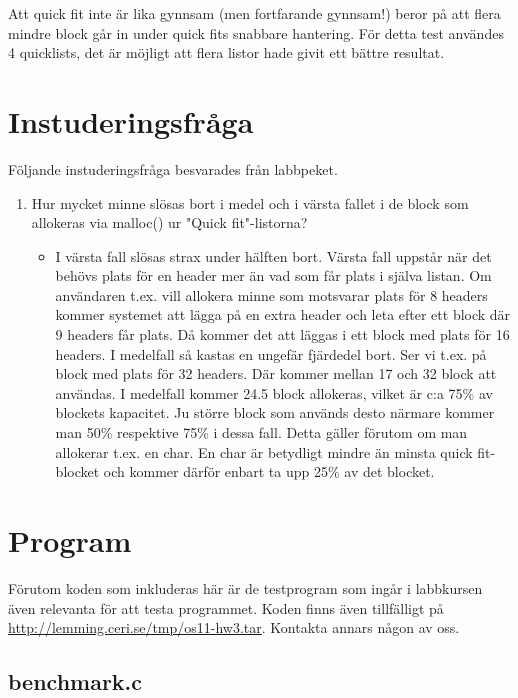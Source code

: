 \documentclass[a4paper,11pt]{article}
\begin{document}
Att quick fit inte är lika gynnsam (men fortfarande gynnsam!) beror på att flera mindre block går in under quick fits snabbare hantering. För detta test användes 4 quicklists, det är möjligt att flera listor hade givit ett bättre resultat.

\section*{Instuderingsfråga}

Följande instuderingsfråga besvarades från labbpeket.

\begin{enumerate}
	\item Hur mycket minne slösas bort i medel och i värsta fallet i de block som allokeras via malloc() ur "Quick fit"-listorna?
	\begin{itemize}
		\item I värsta fall slösas strax under hälften bort. Värsta fall uppstår när det behövs plats för en header mer än vad som får plats i själva listan. Om användaren t.ex. vill allokera minne som motsvarar plats för 8 headers kommer systemet att lägga på en extra header och leta efter ett block där 9 headers får plats. Då kommer det att läggas i ett block med plats för 16 headers. I medelfall så kastas en ungefär fjärdedel bort. Ser vi t.ex. på block med plats för 32 headers. Där kommer mellan 17 och 32 block att användas. I medelfall kommer 24.5 block allokeras, vilket är c:a 75\% av blockets kapacitet. Ju större block som används desto närmare kommer man 50\% respektive 75\% i dessa fall. Detta gäller förutom om man allokerar t.ex. en char. En char är betydligt mindre än minsta quick fit-blocket och kommer därför enbart ta upp 25\% av det blocket.
	\end{itemize}
\end{enumerate}

\section*{Program}

Förutom koden som inkluderas här är de testprogram som ingår i labbkursen även relevanta för att testa programmet.
Koden finns även tillfälligt på \url{http://lemming.ceri.se/tmp/os11-hw3.tar}. Kontakta annars någon av oss.

\subsection*{benchmark.c}

\end{document}
